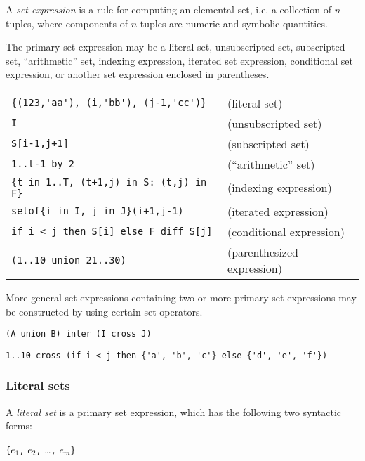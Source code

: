 \documentclass[10pt]{article}
\begin{document}
A {\it set expression} is a rule for computing an elemental set, i.e.
a collection of $n$-tuples, where components of $n$-tuples are numeric
and symbolic quantities.

The primary set expression may be a literal set, unsubscripted set,
subscripted set, ``arithmetic'' set, indexing expression, iterated set
expression, conditional set expression, or another set expression
enclosed in parentheses.

\medskip


\medskip

\noindent
\begin{tabular}{@{}ll@{}}
\verb|{(123,'aa'), (i,'bb'), (j-1,'cc')}|&(literal set)\\
\verb|I|&(unsubscripted set)\\
\verb|S[i-1,j+1]|&(subscripted set)\\
\verb|1..t-1 by 2|&(``arithmetic'' set)\\
\verb|{t in 1..T, (t+1,j) in S: (t,j) in F}|&(indexing expression)\\
\verb|setof{i in I, j in J}(i+1,j-1)|&(iterated expression)\\
\verb|if i < j then S[i] else F diff S[j]|&(conditional expression)\\
\verb|(1..10 union 21..30)|&(parenthesized expression)\\
\end{tabular}

\medskip

More general set expressions containing two or more primary set
expressions may be constructed by using certain set operators.

\medskip


\medskip

\noindent\verb|(A union B) inter (I cross J)|

\noindent
\verb|1..10 cross (if i < j then {'a', 'b', 'c'} else {'d', 'e', 'f'})|

\subsubsection{Literal sets}

A {\it literal set} is a primary set expression, which has the
following two syntactic forms:

\medskip

\noindent\hspace{39pt}
{\tt\{}$e_1${\tt,} $e_2${\tt,} \dots{\tt,} $e_m${\tt\}}
\end{document}
